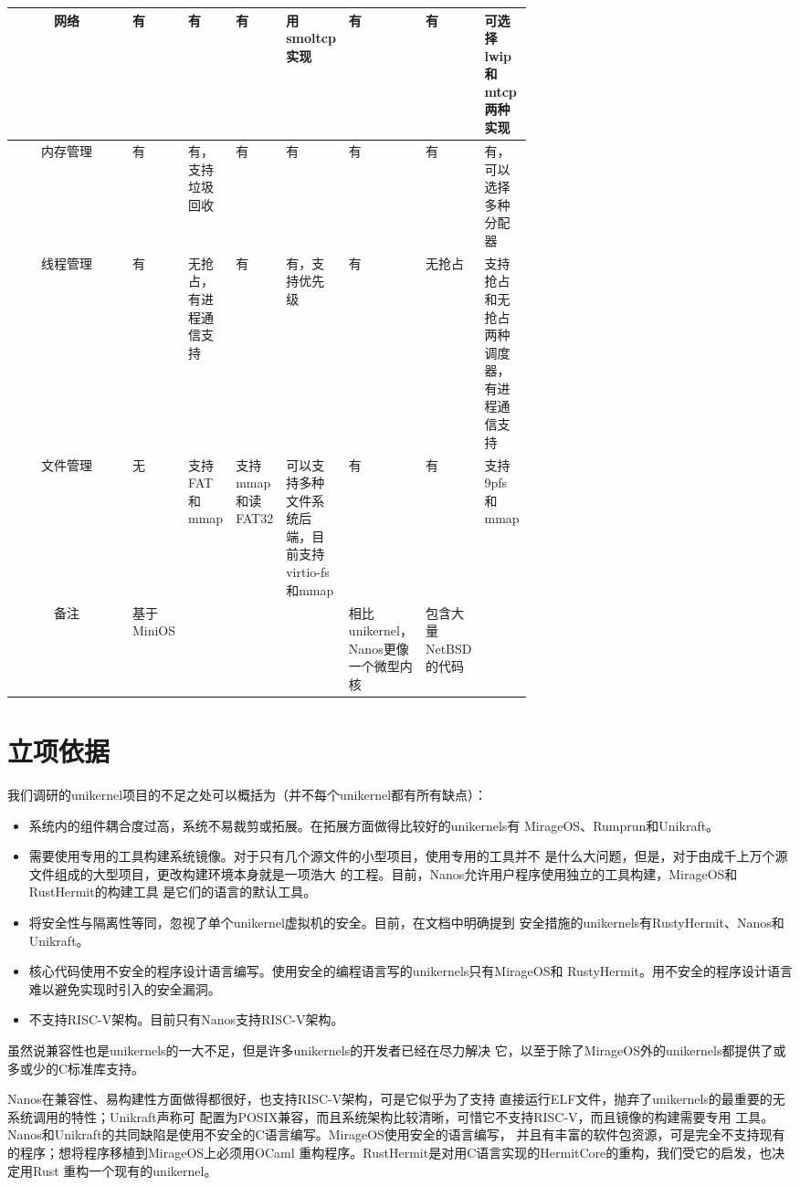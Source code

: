 \documentclass{../runikraft-report}
\begin{document}
\begin{longtable}{|c*{7}{|>{\centering\arraybackslash}p{0.095\linewidth}}|}
网络&有&有&有&用smoltcp实现&有&有&可选择lwip和mtcp两种实现\\\hline
内存管理&有&有，支持垃圾回收&有&有&有&有&有，可以选择多种分配器\\\hline
线程管理&有&无抢占，有进程通信支持&有&有，支持优先级&有&无抢占&支持抢占和无抢占两种调度器，有进程通信支持\\\hline
文件管理&无&支持FAT和mmap&支持mmap和读FAT32&可以支持多种文件系统后端，目前支持virtio-fs和mmap&有&有&支持9pfs和mmap\\\hline
备注&基于MiniOS&&&&相比unikernel，Nanos更像一个微型内核&包含大量NetBSD的代码&\\\hline
\end{longtable}
\normalsize

\section{立项依据}
我们调研的unikernel项目的不足之处可以概括为（并不每个unikernel都有所有缺点）：
\begin{itemize}
\item 系统内的组件耦合度过高，系统不易裁剪或拓展。在拓展方面做得比较好的unikernels有
MirageOS、Rumprun和Unikraft。
\item 需要使用专用的工具构建系统镜像。对于只有几个源文件的小型项目，使用专用的工具并不
是什么大问题，但是，对于由成千上万个源文件组成的大型项目，更改构建环境本身就是一项浩大
的工程。目前，Nanos允许用户程序使用独立的工具构建，MirageOS和RustHermit的构建工具
是它们的语言的默认工具。
\item 将安全性与隔离性等同，忽视了单个unikernel虚拟机的安全。目前，在文档中明确提到
安全措施的unikernels有RustyHermit、Nanos和Unikraft。
\item 核心代码使用不安全的程序设计语言编写。使用安全的编程语言写的unikernels只有MirageOS和
RustyHermit。用不安全的程序设计语言难以避免实现时引入的安全漏洞。
\item 不支持RISC-V架构。目前只有Nanos支持RISC-V架构。
\end{itemize}
虽然说兼容性也是unikernels的一大不足，但是许多unikernels的开发者已经在尽力解决
它，以至于除了MirageOS外的unikernels都提供了或多或少的C标准库支持。

Nanos在兼容性、易构建性方面做得都很好，也支持RISC-V架构，可是它似乎为了支持
直接运行ELF文件，抛弃了unikernels的最重要的无系统调用的特性；Unikraft声称可
配置为POSIX兼容，而且系统架构比较清晰，可惜它不支持RISC-V，而且镜像的构建需要专用
工具。Nanos和Unikraft的共同缺陷是使用不安全的C语言编写。MirageOS使用安全的语言编写，
并且有丰富的软件包资源，可是完全不支持现有的程序；想将程序移植到MirageOS上必须用OCaml
重构程序。RustHermit是对用C语言实现的HermitCore的重构，我们受它的启发，也决定用Rust
重构一个现有的unikernel。
\end{document}
